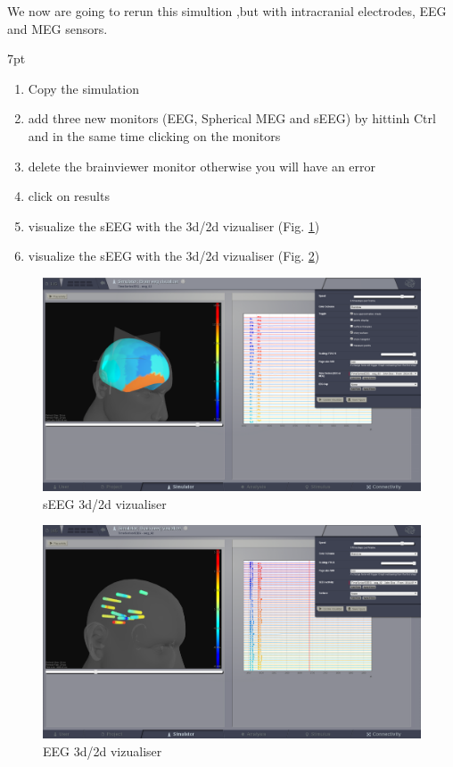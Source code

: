\documentclass{tufte-handout}
\newenvironment{simulation}{%
  \def\FrameCommand{%
    \hspace{1pt}%
    {\color{ForestGreen}\vrule width 2pt}%
    {\color{simulationshade}\vrule width 4pt}%
    \colorbox{simulationshade}%
  }%
  \MakeFramed{\advance\hsize-\width\FrameRestore}%
  \noindent\hspace{-4.55pt}%
  \begin{adjustwidth}{}{7pt}%
  \vspace{2pt}\vspace{2pt}%
}
{%
  \vspace{2pt}\end{adjustwidth}\endMakeFramed%
}
\begin{document}
We now are going to rerun this simultion ,but with intracranial electrodes, EEG and MEG sensors.

\begin{simulation}
  \begin{enumerate}
  \item Copy the simulation
  \item add three new monitors (EEG, Spherical MEG and sEEG) by hittinh Ctrl and in the same time clicking on the monitors
  \item delete the brainviewer monitor otherwise you will have an error
  \item click on results
  \item visualize the sEEG with the 3d/2d vizualiser (Fig. \ref{fig:sEEG})
    \item visualize the sEEG with the 3d/2d vizualiser (Fig. \ref{fig:EEG})
\end{enumerate}
\end{simulation}

\begin{figure}[h]
  \includegraphics[width=\linewidth]{Handout_UI_ModellingAnEpilepticPatient_EEG3d2dBrainVizualiser}%
  \caption{sEEG 3d/2d vizualiser}%
  \label{fig:sEEG}%
\end{figure}

\begin{figure}[h]
  \includegraphics[width=\linewidth]{Handout_UI_ModellingAnEpilepticPatient_sEEG3d2dBrainVizualiser}%
  \caption{EEG 3d/2d vizualiser}%
  \label{fig:EEG}%
\end{figure}
\end{document}

